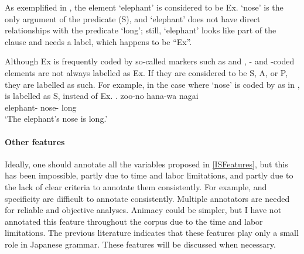 As exemplified in \Last,
the element  `elephant' is considered to be Ex.
 `nose' is the only argument of the predicate (S),
and  `elephant' does not have direct relationships with the predicate  `long';
still,  `elephant' looks like part of the clause and needs a label,
which happens to be ``Ex''.

Although Ex is frequently coded by so-called  markers
such as  and ,
- and -coded elements are not always labelled as Ex.
If they are considered to be S, A, or P,
they are labelled as such.
For example, in the case where  `nose' is coded by  as in \Next,
 is labelled as S, instead of Ex.
%
\exg. zoo-no hana-wa nagai \\
      elephant- nose- long \\
      `The elephant's nose is long.'








\paragraph{Other features}

Ideally, one should annotate all the variables proposed in \ref{ISFeatures},
but this has been impossible, partly due to time and labor limitations, and partly due to the lack of clear criteria to annotate them consistently.
For example,  and specificity are difficult to annotate consistently.
Multiple annotators are needed for reliable and objective analyses.
Animacy could be simpler, but I have not annotated this feature throughout the corpus due to the time and labor limitations.
The previous literature indicates that
these features play only a small role in Japanese grammar.
These features will be discussed when necessary.


